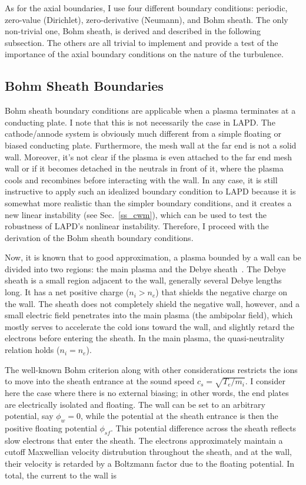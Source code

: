 As for the axial boundaries, I use four different boundary conditions: periodic, zero-value (Dirichlet), zero-derivative (Neumann), and Bohm sheath. 
The only non-trivial one, Bohm sheath, is derived and described in
the following subsection. The others are all trivial to implement and provide a test of the importance of the axial boundary conditions on the nature of the turbulence.

\subsection{Bohm Sheath Boundaries}
\label{ss_bs_bc}

Bohm sheath boundary conditions are applicable when a plasma terminates at a conducting plate. I note that this is not necessarily the case in LAPD. 
The cathode/annode system is obviously much different from a simple floating or biased conducting plate. Furthermore, the mesh wall at the far end is not a solid wall.
Moreover, it's not clear if the plasma is even attached to the far end mesh wall or if it becomes detached in the neutrals in front of it, where the plasma cools and recombines
before interacting with the wall. In any case, it is still instructive to apply such an idealized boundary condition to LAPD because it is somewhat more realistic
than the simpler boundary conditions, and it creates a new linear instability (see Sec.~\ref{ss_cwm}), which can be used to test the robustness of LAPD's nonlinear instability.
Therefore, I proceed with the derivation of the Bohm sheath boundary conditions.

Now, it is known that to good approximation, a plasma bounded by a wall can be divided into two regions: the main plasma and the Debye sheath~\cite{stangeby2000}. 
The Debye sheath is a small region adjacent to the wall, generally several Debye lengths long. It has a net positive charge ($n_i > n_e$) 
that shields the negative charge on the wall. The sheath does not completely shield the negative wall, however, and a small electric field penetrates into
the main plasma (the ambipolar field), which mostly serves to accelerate the cold ions toward the wall, and slightly retard the electrons before entering the sheath.
In the main plasma, the quasi-neutrality relation holds ($n_i = n_e$). 

The well-known Bohm criterion along with other considerations restricts the ions to move into the sheath entrance at the sound speed $c_s = \sqrt{T_e/m_i}$. 
I consider here the case where there is no external biasing; in other words, the end plates are electrically isolated and floating.
The wall can be set to an arbitrary potential, say $\phi_w = 0$, while the potential at the sheath entrance is then the positive 
floating potential $\phi_{sf}$. This potential difference across the sheath reflects slow electrons that enter the sheath.
The electrons approximately maintain a cutoff Maxwellian velocity distrubution throughout the sheath, and at the wall, 
their velocity is retarded by a Boltzmann factor due to the floating potential. 
In total, the current to the wall is~\cite{berk1991,berk1993,xu1993}

